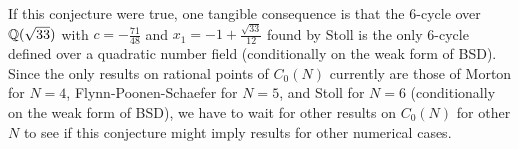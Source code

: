 \begin{remark}
	If this conjecture were true, one tangible consequence is that the
	6-cycle over $\mathbb{Q}(\sqrt{33})$ with $c = -\frac{71}{48}$ and $x_1 = -1 +
	\frac{\sqrt{33}}{12}$ found by Stoll \cite{MR2465796} is the only 6-cycle
	defined over a quadratic number field (conditionally on the weak form of
	BSD). Since the only results on rational points of $C_0(N)$ currently are
	those of Morton \cite{MR1665198} for $N = 4$, Flynn-Poonen-Schaefer
	\cite{MR1480542} for $N = 5$, and Stoll \cite{MR2465796} for $N = 6$
	(conditionally on the weak form of BSD), we have to wait for other results
	on $C_0(N)$ for other $N$ to see if this conjecture might imply results for
	other numerical cases.
\end{remark}

